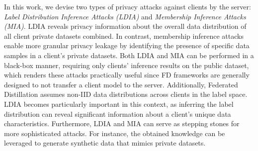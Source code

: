 In this work, we devise two types of privacy attacks against clients by the server: \textit{Label Distribution Inference Attacks (LDIA)} and \textit{Membership Inference Attacks (MIA)}.
LDIA reveals privacy information about the overall data distribution of all client private datasets combined. In contrast, membership inference attacks enable more granular privacy leakage by identifying the presence of specific data samples in a client's private datasets.
Both LDIA and MIA can be performed in a black-box manner, requiring only clients' inference results on the public dataset, which renders these attacks practically useful since FD frameworks are generally designed to not transfer a client model to the server.
Additionally, Federated Distillation assumes non-IID data distributions across clients in the label space.
LDIA becomes particularly important in this context, as inferring the label distribution can reveal significant information about a client's unique data characteristics. 
Furthermore, LDIA and MIA can serve as stepping stones for more sophisticated attacks.
For instance, the obtained knowledge can be leveraged to generate synthetic data that mimics private datasets.

